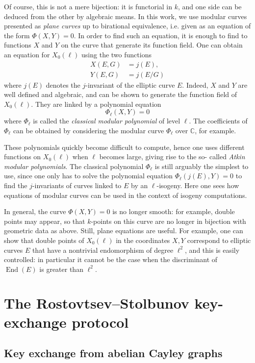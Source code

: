 \documentclass{article}
\newcommand{\C}{\mathbb{C}}
\theoremstyle{definition}
\DeclareMathOperator{\End}{End}
\begin{document}
Of course, this is not a mere bijection: it is functorial in $k$, and one side 
can be deduced from the other by algebraic means.
In this work, we use modular curves presented as \emph{plane curves} up to 
birational equivalence, i.e. given as an equation of the form
$\Phi(X, Y) = 0.$
In order to find such an equation, it is enough to find to functions $X$ and $Y$
 on the curve that generate its function field. One can obtain an equation for $
X_0(\ell)$ using the two functions
\[
\begin{aligned}
X(E, G) &= j(E), \\
Y(E, G) &= j(E/G)
\end{aligned}
\]
where $j(E)$ denotes the $j$-invariant of the elliptic curve $E$. Indeed, $X$ 
and $Y$ are well defined and algebraic, and can be shown to generate the 
function field of $X_0(\ell)$. They are linked by a polynomial equation
\[
\Phi_\ell(X, Y) = 0
\]
where $\Phi_\ell$ is called the \emph{classical modular polynomial} of level $
\ell$. The coefficients of $\Phi_\ell$ can be obtained by considering the 
modular curve $\Phi_\ell$ over $\C$, for example.

These polynomials quickly become difficult to compute, hence one uses different 
functions on $X_0(\ell)$ when $\ell$ becomes large, giving rise to the so-
called \emph{Atkin modular polynomials}. The classical polynomial $\Phi_\ell$ 
is still arguably the simplest to use, since one only has to solve the 
polynomial equation $\Phi_\ell(j(E), Y) = 0$ to find the $j$-invariants of 
curves linked to $E$ by an $\ell$-isogeny. Here one sees how equations of 
modular curves can be used in the context of isogeny computations.

In general, the curve $\Phi(X, Y) = 0$ is no longer smooth: for example, double 
points may appear, so that $k$-points on this curve are no longer in bijection 
with geometric data as above. Still, plane equations are useful. For example, 
one can show that double points of $X_0(\ell)$ in the coordinates $X, Y$ 
correspond to elliptic curves $E$ that have a nontrivial endomorphism of degree 
$\ell^2$, and this is easily controlled: in particular it cannot be the case
when the discriminant of $\End(E)$ is greater than $\ell^2$.


\section{The Rostovtsev--Stolbunov key-exchange protocol}
\label{sec:keyex}

\subsection{Key exchange from abelian Cayley graphs}
\end{document}
